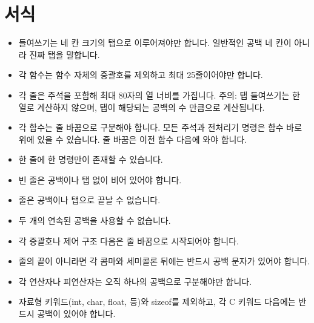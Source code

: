 \documentclass{42-ko}
\begin{document}
    \section{서식}

            \begin{itemize}

                \item 들여쓰기는 네 칸 크기의 탭으로 이루어져야만 합니다.
                  일반적인 공백 네 칸이 아니라 진짜 탭을 말합니다.

                \item 각 함수는 함수 자체의 중괄호를 제외하고
                  최대 25줄이어야만 합니다.

                \item 각 줄은 주석을 포함해 최대 80자의 열 너비를 가집니다.
                  주의: 탭 들여쓰기는 한 열로 계산하지 않으며,
                  탭이 해당되는 공백의 수 만큼으로 계산됩니다.

                \item 각 함수는 줄 바꿈으로 구분해야 합니다.
                  모든 주석과 전처리기 명령은 함수 바로 위에 있을 수 있습니다.
                  줄 바꿈은 이전 함수 다음에 와야 합니다.

                \item 한 줄에 한 명령만이 존재할 수 있습니다.

                \item 빈 줄은 공백이나 탭 없이 비어 있어야 합니다.

                \item 줄은 공백이나 탭으로 끝날 수 없습니다.

                \item 두 개의 연속된 공백을 사용할 수 없습니다.

                \item 각 중괄호나 제어 구조 다음은 줄 바꿈으로 시작되어야 합니다.

                \item 줄의 끝이 아니라면 각 콤마와 세미콜론 뒤에는 반드시 공백 문자가
                  있어야 합니다.

                \item 각 연산자나 피연산자는 오직 하나의 공백으로 구분해야만 합니다.

                \item 자료형 키워드(int, char, float, 등)와 sizeof를 제외하고,
                  각 C 키워드 다음에는 반드시 공백이 있어야 합니다.


\end{itemize}
\end{document}
